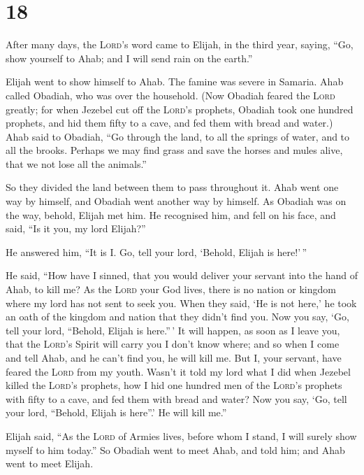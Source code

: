 \hypertarget{section-17}{%
\section{18}\label{section-17}}

 After many days, the \textsc{Lord}'s word came to Elijah,
in the third year, saying, ``Go, show yourself to Ahab; and I will send
rain on the earth.''

 Elijah went to show himself to Ahab. The famine was
severe in Samaria.  Ahab called Obadiah, who was over the
household. (Now Obadiah feared the \textsc{Lord} greatly; 
for when Jezebel cut off the \textsc{Lord}'s prophets, Obadiah took one
hundred prophets, and hid them fifty to a cave, and fed them with bread
and water.)  Ahab said to Obadiah, ``Go through the land,
to all the springs of water, and to all the brooks. Perhaps we may find
grass and save the horses and mules alive, that we not lose all the
animals.''

 So they divided the land between them to pass throughout
it. Ahab went one way by himself, and Obadiah went another way by
himself.  As Obadiah was on the way, behold, Elijah met
him. He recognised him, and fell on his face, and said, ``Is it you, my
lord Elijah?''

 He answered him, ``It is I. Go, tell your lord, `Behold,
Elijah is here!'\,''

 He said, ``How have I sinned, that you would deliver your
servant into the hand of Ahab, to kill me?  As the
\textsc{Lord} your God lives, there is no nation or kingdom where my
lord has not sent to seek you. When they said, `He is not here,' he took
an oath of the kingdom and nation that they didn't find you.
 Now you say, `Go, tell your lord, ``Behold, Elijah is
here.''\,'  It will happen, as soon as I leave you, that
the \textsc{Lord}'s Spirit will carry you I don't know where; and so
when I come and tell Ahab, and he can't find you, he will kill me. But
I, your servant, have feared the \textsc{Lord} from my youth.
 Wasn't it told my lord what I did when Jezebel killed
the \textsc{Lord}'s prophets, how I hid one hundred men of the
\textsc{Lord}'s prophets with fifty to a cave, and fed them with bread
and water?  Now you say, `Go, tell your lord, ``Behold,
Elijah is here''.' He will kill me.''

 Elijah said, ``As the \textsc{Lord} of Armies lives,
before whom I stand, I will surely show myself to him today.''
 So Obadiah went to meet Ahab, and told him; and Ahab
went to meet Elijah.

